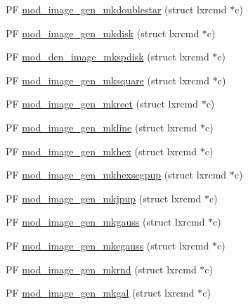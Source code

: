 \begin{DoxyCompactItemize}
\item 
P\+F \hyperlink{src_2image__gen_2image__gen-util_8c_ae711902bde27e26dc070bda9087c1628}{mod\+\_\+image\+\_\+gen\+\_\+mkdoublestar} (struct lxrcmd $\ast$c)
\item 
P\+F \hyperlink{src_2image__gen_2image__gen-util_8c_a3d80af29d0752bc59a85d13fd3acc09c}{mod\+\_\+image\+\_\+gen\+\_\+mkdisk} (struct lxrcmd $\ast$c)
\item 
P\+F \hyperlink{src_2image__gen_2image__gen-util_8c_aa3f0614861b90486ed8450153d073633}{mod\+\_\+den\+\_\+image\+\_\+mkspdisk} (struct lxrcmd $\ast$c)
\item 
P\+F \hyperlink{src_2image__gen_2image__gen-util_8c_a07f8ed2e7bbf4a7fd8bf4445148304ee}{mod\+\_\+image\+\_\+gen\+\_\+mksquare} (struct lxrcmd $\ast$c)
\item 
P\+F \hyperlink{src_2image__gen_2image__gen-util_8c_a72b25a6d62a1c60cae1a47a6322eac92}{mod\+\_\+image\+\_\+gen\+\_\+mkrect} (struct lxrcmd $\ast$c)
\item 
P\+F \hyperlink{src_2image__gen_2image__gen-util_8c_abea55b6781ae9f67de79dc5282057c6a}{mod\+\_\+image\+\_\+gen\+\_\+mkline} (struct lxrcmd $\ast$c)
\item 
P\+F \hyperlink{src_2image__gen_2image__gen-util_8c_a20cbf717cff48a21b32b329d75957208}{mod\+\_\+image\+\_\+gen\+\_\+mkhex} (struct lxrcmd $\ast$c)
\item 
P\+F \hyperlink{src_2image__gen_2image__gen-util_8c_adfa79e5d577753c71ba0fd2230c63d42}{mod\+\_\+image\+\_\+gen\+\_\+mkhexsegpup} (struct lxrcmd $\ast$c)
\item 
P\+F \hyperlink{src_2image__gen_2image__gen-util_8c_aa8ccdbd620046813b2eff887fa6d06ac}{mod\+\_\+image\+\_\+gen\+\_\+mkjpup} (struct lxrcmd $\ast$c)
\item 
P\+F \hyperlink{src_2image__gen_2image__gen-util_8c_a3ce403061bd5d2d1671a3cb28daa8662}{mod\+\_\+image\+\_\+gen\+\_\+mkgauss} (struct lxrcmd $\ast$c)
\item 
P\+F \hyperlink{src_2image__gen_2image__gen-util_8c_a5212fcc463c8f1c9dc689b1f0b35f905}{mod\+\_\+image\+\_\+gen\+\_\+mkegauss} (struct lxrcmd $\ast$c)
\item 
P\+F \hyperlink{src_2image__gen_2image__gen-util_8c_a07401df65054a16dde93b91c71d30e87}{mod\+\_\+image\+\_\+gen\+\_\+mkrnd} (struct lxrcmd $\ast$c)
\item 
P\+F \hyperlink{src_2image__gen_2image__gen-util_8c_a92a1d5daf076e57bb4050df292498dbb}{mod\+\_\+image\+\_\+gen\+\_\+mkgal} (struct lxrcmd $\ast$c)

\end{DoxyCompactItemize}
